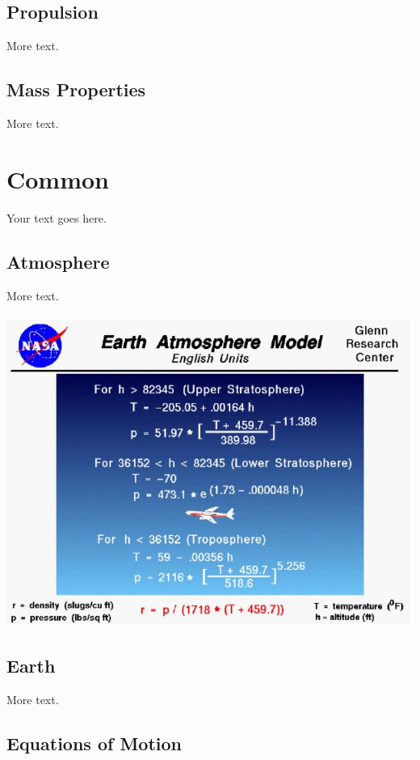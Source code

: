 \documentclass[11pt]{article} %
\begin{document}
\subsection{Propulsion}

More text.

\subsection{Mass Properties}

More text.

\section{Common}

Your text goes here.

\subsection{Atmosphere}

More text.
\begin{center}
    \includegraphics[width=1\textwidth]{atmosphere}
\end{center}

\subsection{Earth}

More text.

\subsection{Equations of Motion}
\end{document}
